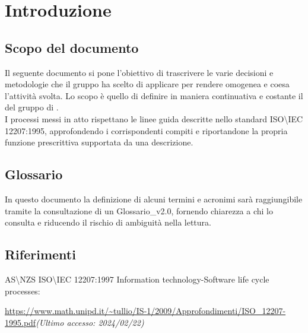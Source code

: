 \chapter{Introduzione}

\section{Scopo del documento}
Il seguente documento si pone l'obiettivo di trascrivere le varie decisioni e metodologie che il gruppo ha scelto di applicare per rendere omogenea e coesa l'attività svolta. Lo scopo è quello di definire in maniera continuativa e costante il  del gruppo di .\\
I processi messi in atto rispettano le linee guida descritte nello standard ISO\textbackslash IEC 12207:1995, approfondendo i corrispondenti compiti e riportandone la propria funzione prescrittiva supportata da una descrizione.

\section{Glossario}
In questo documento la definizione di alcuni termini e acronimi sarà raggiungibile tramite la consultazione di un Glossario\_v2.0, fornendo chiarezza a chi lo consulta e riducendo il rischio di ambiguità nella lettura.

\section{Riferimenti}
AS\textbackslash NZS ISO\textbackslash IEC 12207:1997 Information technology-Software life cycle processes:\\
\begin{footnotesize}
    \url{https://www.math.unipd.it/~tullio/IS-1/2009/Approfondimenti/ISO_12207-1995.pdf}\textit{(Ultimo accesso: 2024/02/22)}
\end{footnotesize}
